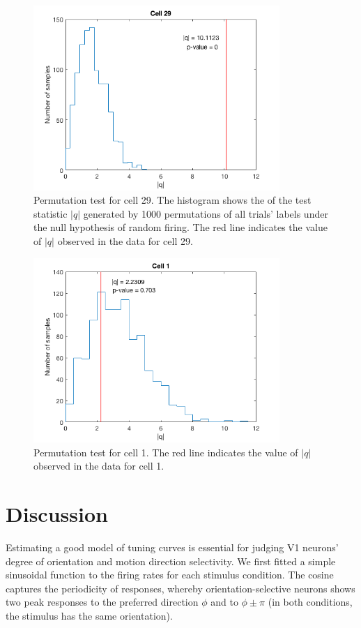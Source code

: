 \documentclass[10pt]{article}
\begin{document}
\begin{figure}[!h]
\centering
\includegraphics[height=7cm]{permplot.png}
\caption{Permutation test for cell 29. The histogram shows the of the test statistic $|q|$ generated by 1000 permutations of all trials' labels under the null hypothesis of random firing. The red line indicates the value of $|q|$ observed in the data for cell 29.
\label{permplot29}}
\end{figure}

\begin{figure}[!h]
\centering
\includegraphics[height=7cm]{permplot1.png}
\caption{Permutation test for cell 1. The red line indicates the value of $|q|$ observed in the data for cell 1.
\label{permplot1}}
\end{figure}

 
\section*{Discussion}

Estimating a good model of tuning curves is essential for judging V1 neurons' degree of orientation and motion direction selectivity. We first fitted a simple sinusoidal function to the firing rates for each stimulus condition. The cosine captures the periodicity of responses, whereby orientation-selective neurons shows two peak responses to the preferred direction $\phi$ and to $\phi \pm \pi$ (in both conditions, the stimulus has the same orientation). \\
\end{document}
